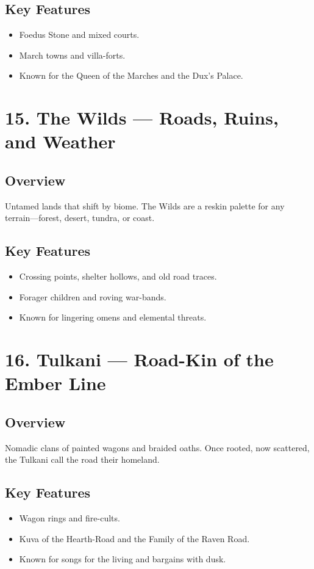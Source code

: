 \documentclass[11pt]{article}
\begin{document}
\subsection*{Key Features}
\begin{itemize}[leftmargin=*]
    \item Foedus Stone and mixed courts.
    \item March towns and villa-forts.
    \item Known for the Queen of the Marches and the Dux’s Palace.
\end{itemize}

\section*{15. The Wilds — Roads, Ruins, and Weather}

\subsection*{Overview}
Untamed lands that shift by biome. The Wilds are a reskin palette for any terrain—forest, desert, tundra, or coast.

\subsection*{Key Features}
\begin{itemize}[leftmargin=*]
    \item Crossing points, shelter hollows, and old road traces.
    \item Forager children and roving war-bands.
    \item Known for lingering omens and elemental threats.
\end{itemize}

\section*{16. Tulkani — Road-Kin of the Ember Line}

\subsection*{Overview}
Nomadic clans of painted wagons and braided oaths. Once rooted, now scattered, the Tulkani call the road their homeland.

\subsection*{Key Features}
\begin{itemize}[leftmargin=*]
    \item Wagon rings and fire-cults.
    \item Kuva of the Hearth-Road and the Family of the Raven Road.
    \item Known for songs for the living and bargains with dusk.
\end{itemize}
\end{document}
